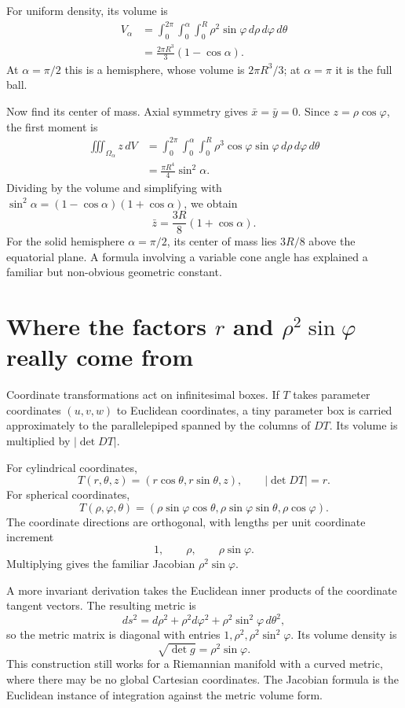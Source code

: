 For uniform density, its volume is
\[
 \begin{aligned}
 V_\alpha
 &=\int_0^{2\pi}\int_0^\alpha\int_0^R
       \rho^2\sin\varphi\,d\rho\,d\varphi\,d\theta\\
 &=\boxed{\frac{2\pi R^3}{3}(1-\cos\alpha)}.
 \end{aligned}
\]
At \(\alpha=\pi/2\) this is a hemisphere, whose volume is \(2\pi R^3/3\); at \(\alpha=\pi\) it is the full ball.

Now find its center of mass. Axial symmetry gives \(\bar x=\bar y=0\). Since \(z=\rho\cos\varphi\), the first moment is
\[
 \begin{aligned}
 \iiint_{\Omega_\alpha}z\,dV
 &=\int_0^{2\pi}\int_0^\alpha\int_0^R
       \rho^3\cos\varphi\sin\varphi
       \,d\rho\,d\varphi\,d\theta\\
 &=\frac{\pi R^4}{4}\sin^2\alpha.
 \end{aligned}
\]
Dividing by the volume and simplifying with
\(\sin^2\alpha=(1-\cos\alpha)(1+\cos\alpha)\), we obtain
\[
 \boxed{\bar z=\frac{3R}{8}(1+\cos\alpha).}
\]
For the solid hemisphere \(\alpha=\pi/2\), its center of mass lies \(3R/8\) above the equatorial plane. A formula involving a variable cone angle has explained a familiar but non-obvious geometric constant.

\section[The cylindrical and spherical volume factors]{Where the factors \(r\) and \(\rho^2\sin\varphi\) really come from}

Coordinate transformations act on infinitesimal boxes. If \(T\) takes parameter coordinates \((u,v,w)\) to Euclidean coordinates, a tiny parameter box is carried approximately to the parallelepiped spanned by the columns of \(DT\). Its volume is multiplied by \(|\det DT|\).

For cylindrical coordinates,
\[
 T(r,\theta,z)=(r\cos\theta,r\sin\theta,z),
 \qquad |\det DT|=r.
\]
For spherical coordinates,
\[
 T(\rho,\varphi,\theta)
 =(\rho\sin\varphi\cos\theta,\rho\sin\varphi\sin\theta,\rho\cos\varphi).
\]
The coordinate directions are orthogonal, with lengths per unit coordinate increment
\[
 1,\qquad \rho,\qquad \rho\sin\varphi.
\]
Multiplying gives the familiar Jacobian \(\rho^2\sin\varphi\).

A more invariant derivation takes the Euclidean inner products of the coordinate tangent vectors. The resulting metric is
\[
 ds^2=d\rho^2+\rho^2d\varphi^2+
       \rho^2\sin^2\varphi\,d\theta^2,
\]
so the metric matrix is diagonal with entries
\(1,\rho^2,\rho^2\sin^2\varphi\). Its volume density is
\[
 \boxed{\sqrt{\det g}=\rho^2\sin\varphi.}
\]
This construction still works for a Riemannian manifold with a curved metric, where there may be no global Cartesian coordinates. The Jacobian formula is the Euclidean instance of integration against the metric volume form.

